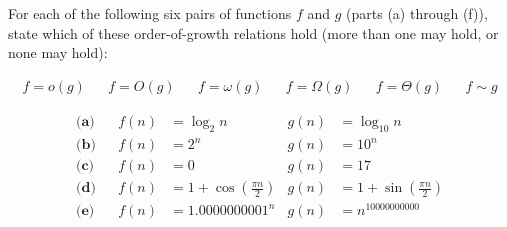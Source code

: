 \documentclass[12pt,twoside]{article}
\begin{document}
\begin{problem}{20}
For each of the following six pairs of functions $f$ and $g$ (parts (a) through (f)), state which of these order-of-growth relations hold (more than one may hold, or none may hold):

\begin{align*}
 f = o(g) && f=O(g) && f=\omega(g) && f=\Omega(g) && f=\Theta(g) && f \sim g
\end{align*}

\begin{align*}
\textbf{(a)}&& f(n) &= \log_2 n &  g(n) &= \log_{10} n \\
\textbf{(b)}&& f(n) &= 2^n & g(n) &= 10^n\\
\textbf{(c)}&& f(n) &= 0 & g(n) &= 17\\
\textbf{(d)}&& f(n) &= 1+\cos\left(\frac{\pi n}{2}\right) & g(n) &= 1+\sin\left(\frac{\pi n}{2}\right)\\
\textbf{(e)}&& f(n) &= {1.0000000001}^n & g(n) &= n^{10000000000}\\
\end{align*}

\end{problem}
\end{document}
